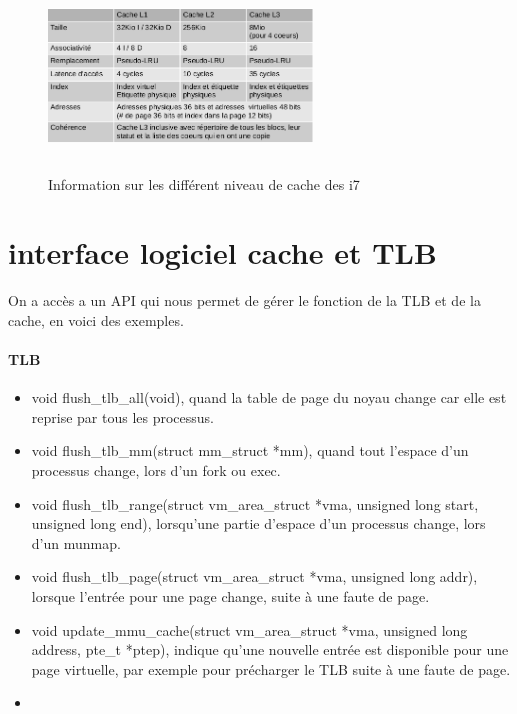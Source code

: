 \documentclass[oneside]{book}
\begin{document}
\begin{figure}[!ht]
\centering
\includegraphics[height=5cm, width=7cm, keepaspectratio]{Cachei7.png}
\caption{Information sur les différent niveau de cache des i7}
\label{fig:Cachei7}
\end{figure}

\section{interface logiciel cache et TLB}
On a accès a un API qui nous permet de gérer le fonction de la TLB et de la cache, en voici des exemples.

\paragraph{TLB}
\begin{itemize}
\item void flush\_tlb\_all(void), quand la table de page du noyau change car elle est
reprise par tous les processus.
\item void flush\_tlb\_mm(struct mm\_struct *mm), quand tout l'espace d'un processus
change, lors d'un fork ou exec.
\item void flush\_tlb\_range(struct vm\_area\_struct *vma, unsigned long start, unsigned
long end), lorsqu'une partie d'espace d'un processus change, lors d'un munmap.
\item void flush\_tlb\_page(struct vm\_area\_struct *vma, unsigned long addr), lorsque
l'entrée pour une page change, suite à une faute de page.
\item void update\_mmu\_cache(struct vm\_area\_struct *vma, unsigned long address,
pte\_t *ptep), indique qu'une nouvelle entrée est disponible pour une page
virtuelle, par exemple pour précharger le TLB suite à une faute de page.
\item 
\end{itemize}
\end{document}
